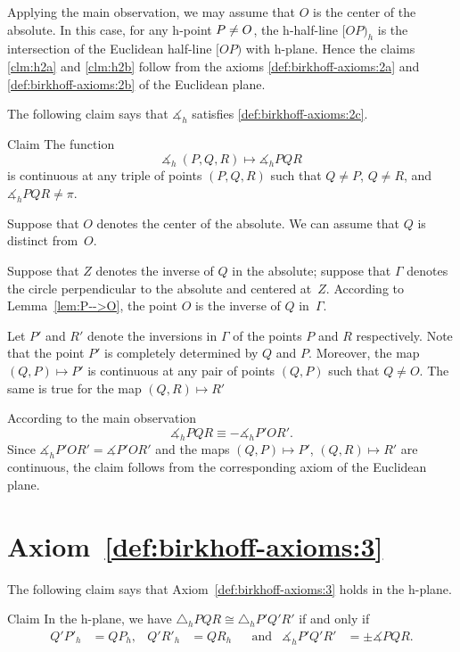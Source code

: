 Applying the main observation, 
we may assume that $O$ is the center of the absolute.
In this case, for any h-point $P\z\ne O$, the h-half-line
$[OP)_h$ is the intersection of the Euclidean half-line $[OP)$ with h-plane.
Hence the claims \ref{clm:h2a} and \ref{clm:h2b} 
follow from the axioms \ref{def:birkhoff-axioms:2a} and \ref{def:birkhoff-axioms:2b} of the Euclidean plane.
\qeds

The following claim says that
$\measuredangle_h$ satisfies
 \ref{def:birkhoff-axioms:2c}.

\begin{thm}{Claim}\label{clm:h2c}
The function 
$$\measuredangle_h\:(P,Q,R)\mapsto\measuredangle_h P Q R$$
is continuous at any triple of points $(P,Q,R)$
such that $Q\ne P$, $Q\ne R$, and $\measuredangle_h P Q R\ne\pi$.
\end{thm}

Suppose that $O$ denotes the center of the absolute.
We can assume that $Q$ is distinct from~$O$.

Suppose that $Z$ denotes the inverse of $Q$ in the absolute;
suppose that $\Gamma$ denotes the circle perpendicular to the absolute and centered at~$Z$.
According to Lemma~\ref{lem:P-->O},
the point $O$ is the inverse of $Q$ in~$\Gamma$.

Let $P'$ and $R'$ denote the inversions in $\Gamma$ of the points $P$ and $R$ respectively.
Note that the point $P'$ is completely determined by $Q$ and $P$.
Moreover, the map $(Q,P)\mapsto P'$ is continuous at any pair of points $(Q,P)$ such that $Q\ne O$.
The same is true for the map $(Q,R)\mapsto R'$

According to the main observation 
$$\measuredangle_h P Q R\equiv -\measuredangle_h P' O R'.$$
Since $\measuredangle_h P' O R'=\measuredangle P' O R'$ and 
the maps $(Q,P)\mapsto P'$, $(Q,R)\mapsto R'$ are continuous,
the claim follows from the corresponding axiom of the Euclidean plane.
\qeds

\section*{Axiom~\ref{def:birkhoff-axioms:3}}

The following claim says that Axiom~\ref{def:birkhoff-axioms:3} holds in the h-plane.

\begin{thm}{Claim}
In the h-plane, we have
$\triangle_h P Q R 
\cong
\triangle_h P' Q' R'$
if and only if 
\begin{align*}
Q' P'_h&=Q P_h, & Q' R'_h&= Q R_h &&\text{and}
&\measuredangle_h P' Q' R'&=\pm\measuredangle P Q R.
\end{align*}
 
\end{thm}

